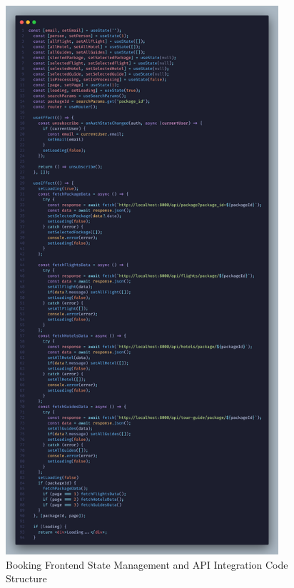 \begin{figure}[H]
    \centering
    \includegraphics[width=0.9\textwidth]{./figures/implementation/booking-frontend.png}
    \caption{Booking Frontend State Management and API Integration Code Structure}
    \label{fig:booking_frontend}
\end{figure}

